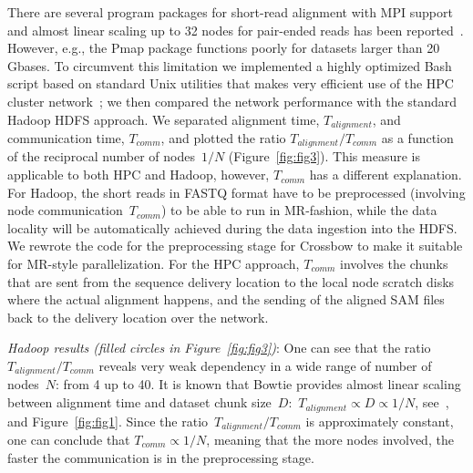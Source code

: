 \documentclass[10pt]{article}
\newcommand{\Fixme}[1]{{\color{FixmeColor}{#1}}}
\begin{document}
There are several program packages for short-read alignment with MPI support~\cite{pmap, gnumap} and almost linear scaling up to 32 nodes for pair-ended reads has been reported~\cite{Bozdag:2010cn}.
%
However, e.g., the Pmap package functions poorly for datasets larger than 20 Gbases.
\Fixme{(so, after reading the previous sentence, the logical question is ``why
not use gnumap?'')}
%
To circumvent this limitation we implemented a highly optimized Bash script
based on standard Unix utilities that makes very efficient use of the HPC
cluster network~\cite{code_repo_bash}; we then compared the network
performance with the standard Hadoop HDFS approach. We separated alignment
time, $T_{alignment}$, and communication time, $T_{comm}$, and plotted
the ratio $T_{alignment}/T_{comm}$ as a function of the reciprocal number of nodes~$1/N$
(Figure~\ref{fig:fig3}).  This measure is applicable to both HPC and Hadoop,
however, $T_{comm}$ has a different explanation. For Hadoop, the short reads in
FASTQ format have to be preprocessed (involving node communication~$T_{comm}$)
to be able to run in MR-fashion, while the data locality will be automatically
achieved during the data ingestion into the HDFS\@.  We rewrote the code for the
preprocessing stage for Crossbow to make it suitable for MR-style
parallelization.  For the HPC approach, $T_{comm}$ involves the chunks that are
sent from the sequence delivery location to the local node scratch disks where
the actual alignment happens, and the sending of the aligned SAM files back to
the delivery location over the network.


\textit{Hadoop results (filled circles in Figure~\ref{fig:fig3})}: One can see that the ratio~$T_{alignment}/T_{comm}$ reveals very weak dependency in a wide range of number of nodes~$N$: from 4 up to 40. It is known that Bowtie provides almost linear scaling between alignment time and dataset chunk size~$D$:~$T_{alignment}\propto  D\propto 1/N$, see~\cite{Langmead:2009uq}, and Figure~\ref{fig:fig1}. Since the ratio~$T_{alignment}/T_{comm}$ is approximately constant, one can conclude that $T_{comm}\propto 1/N$, meaning that the more nodes involved, the faster the communication is in the preprocessing stage.
\end{document}
